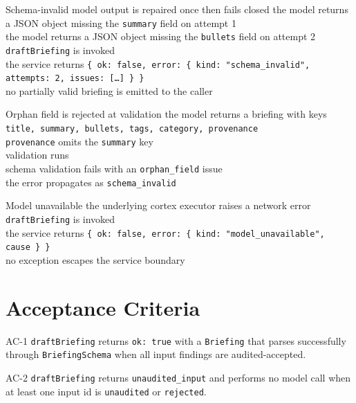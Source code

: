 \begin{scenario}{Schema-invalid model output is repaired once then fails closed}
\Given the model returns a JSON object missing the \texttt{summary} field on attempt 1 \\
\And the model returns a JSON object missing the \texttt{bullets} field on attempt 2 \\
\When \texttt{draftBriefing} is invoked \\
\Then the service returns \texttt{\{ ok: false, error: \{ kind: "schema\_invalid", attempts: 2, issues: [\ldots] \} \}} \\
\And no partially valid briefing is emitted to the caller
\end{scenario}

\begin{scenario}{Orphan field is rejected at validation}
\Given the model returns a briefing with keys \texttt{title, summary, bullets, tags, category, provenance} \\
\And \texttt{provenance} omits the \texttt{summary} key \\
\When validation runs \\
\Then schema validation fails with an \texttt{orphan\_field} issue \\
\And the error propagates as \texttt{schema\_invalid}
\end{scenario}

\begin{scenario}{Model unavailable}
\Given the underlying cortex executor raises a network error \\
\When \texttt{draftBriefing} is invoked \\
\Then the service returns \texttt{\{ ok: false, error: \{ kind: "model\_unavailable", cause \} \}} \\
\And no exception escapes the service boundary
\end{scenario}

\section{Acceptance Criteria}

\begin{ac}{AC-1}
\texttt{draftBriefing} returns \texttt{ok: true} with a \texttt{Briefing} that parses successfully through \texttt{BriefingSchema} when all input findings are audited-accepted.
\end{ac}

\begin{ac}{AC-2}
\texttt{draftBriefing} returns \texttt{unaudited\_input} and performs no model call when at least one input id is \texttt{unaudited} or \texttt{rejected}.
\end{ac}

